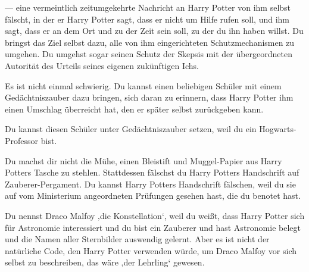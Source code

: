 — eine vermeintlich zeitumgekehrte Nachricht an Harry Potter von ihm selbst fälscht, in der er Harry Potter sagt, dass er nicht um Hilfe rufen soll, und ihm sagt, dass er an dem Ort und zu der Zeit sein soll, zu der du ihn haben willst. Du bringst das Ziel selbst dazu, alle von ihm eingerichteten Schutzmechanismen zu umgehen. Du umgehst sogar seinen Schutz der Skepsis mit der übergeordneten Autorität des Urteils seines eigenen zukünftigen Ichs.

Es ist nicht einmal schwierig. Du kannst einen beliebigen Schüler mit einem Gedächtniszauber dazu bringen, sich daran zu erinnern, dass Harry Potter ihm einen Umschlag überreicht hat, den er später selbst zurückgeben kann.

Du kannst diesen Schüler unter Gedächtniszauber setzen, weil du ein Hogwarts-Professor bist.

Du machst dir nicht die Mühe, einen Bleistift und Muggel-Papier aus Harry Potters Tasche zu stehlen. Stattdessen fälschst du Harry Potters Handschrift auf Zauberer-Pergament. Du kannst Harry Potters Handschrift fälschen, weil du sie auf vom Ministerium angeordneten Prüfungen gesehen hast, die du benotet hast.

Du nennst Draco Malfoy ‚die Konstellation‘, weil du weißt, dass Harry Potter sich für Astronomie interessiert und du bist ein Zauberer und hast Astronomie belegt und die Namen aller Sternbilder auswendig gelernt. Aber es ist nicht der natürliche Code, den Harry Potter verwenden würde, um Draco Malfoy vor sich selbst zu beschreiben, das wäre ‚der Lehrling‘ gewesen.

